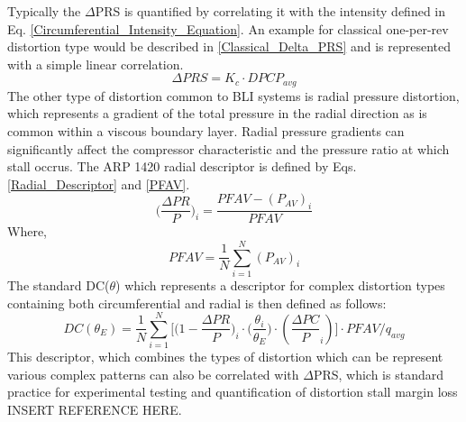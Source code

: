 				Typically the $\Delta$PRS is quantified by correlating it with the intensity defined in Eq. \ref{Circumferential_Intensity_Equation}. An example for classical one-per-rev distortion type would be described in \ref{Classical_Delta_PRS} and is represented with a simple linear correlation.
				\begin{equation}
					\Delta PRS = K_c \cdot DPCP_{avg}
					\label{Classical_Delta_PRS}
				\end{equation}	
				The other type of distortion common to BLI systems is radial pressure distortion, which represents a gradient of the total pressure in the radial direction as is common within a viscous boundary layer.  Radial pressure gradients can significantly affect the compressor characteristic and the pressure ratio at which stall occrus.  The ARP 1420 radial descriptor is defined by Eqs. \ref{Radial_Descriptor} and \ref{PFAV}.
				\begin{equation}
					\Big(\frac{\Delta PR}
					{P}\Big)_i = \frac{PFAV-(P_{AV})_i}
					{PFAV}
					\label{Radial_Descriptor}
				\end{equation}%
				Where,	
				\begin{equation}
					PFAV = \frac{1}
					{N} \sum\limits_{i=1}^{N} (P_{AV})_i
					\label{PFAV}
				\end{equation}%
				The standard DC($\theta$) which represents a descriptor for complex distortion types containing both circumferential and radial is then defined as follows:
				\begin{equation}
					DC(\theta_E) = \frac{1}{N} \sum\limits_{i=1}^{N}\Big[\Big(1-\frac{\Delta PR}{P}\Big)_i \cdot 
								   \Big(\frac{\theta_i}{\theta_E}\Big) \cdot 
								   (\frac{\Delta PC}{P}_i)\Big] \cdot PFAV/q_{avg}
					\label{DC_Theta}
				\end{equation}%
				This descriptor, which combines the types of distortion which can be represent various complex patterns can also be correlated with $\Delta$PRS, which is standard practice for experimental testing and quantification of distortion stall margin loss INSERT REFERENCE HERE.  
				
